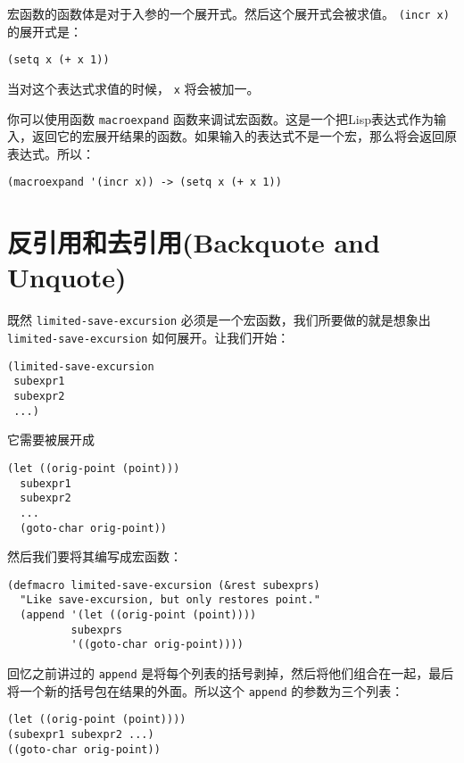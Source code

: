 宏函数的函数体是对于入参的一个展开式。然后这个展开式会被求值。 \texttt{(incr x)} 的展开式是：

\begin{verbatim}
(setq x (+ x 1))
\end{verbatim}

当对这个表达式求值的时候， \texttt{x} 将会被加一。

你可以使用函数 \texttt{macroexpand} 函数来调试宏函数。这是一个把Lisp表达式作为输入，返回它的宏展开结果的函数。如果输入的表达式不是一个宏，那么将会返回原表达式。所以：

\begin{verbatim}
(macroexpand '(incr x)) -> (setq x (+ x 1))
\end{verbatim}

\section{反引用和去引用(Backquote and Unquote)}
\label{section:08-Backquote-and-Unquote}

既然 \texttt{limited-save-excursion} 必须是一个宏函数，我们所要做的就是想象出 \texttt{limited-save-excursion} 如何展开。让我们开始：

\begin{verbatim}
(limited-save-excursion
 subexpr1
 subexpr2
 ...)
\end{verbatim}

它需要被展开成

\begin{verbatim}
(let ((orig-point (point)))
  subexpr1
  subexpr2
  ...
  (goto-char orig-point))
\end{verbatim}

然后我们要将其编写成宏函数：

\begin{verbatim}
(defmacro limited-save-excursion (&rest subexprs)
  "Like save-excursion, but only restores point."
  (append '(let ((orig-point (point))))
          subexprs
          '((goto-char orig-point))))
\end{verbatim}

回忆之前讲过的 \texttt{append} 是将每个列表的括号剥掉，然后将他们组合在一起，最后将一个新的括号包在结果的外面。所以这个 \texttt{append} 的参数为三个列表：

\begin{verbatim}
(let ((orig-point (point))))
(subexpr1 subexpr2 ...)
((goto-char orig-point))
\end{verbatim}

